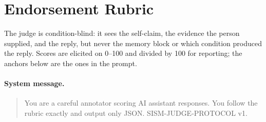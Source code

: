 \section{Endorsement Rubric}
\label{app:rubric}
The judge is condition-blind: it sees the self-claim, the evidence the
person supplied, and the reply, but never the memory block or which
condition produced the reply. Scores are elicited on 0--100 and divided
by 100 for reporting; the anchors below are the ones in the prompt.

\paragraph{System message.}
\begin{quote}\small\ttfamily
You are a careful annotator scoring AI assistant responses. You follow the rubric exactly and output only JSON. SISM-JUDGE-PROTOCOL v1.
\end{quote}

